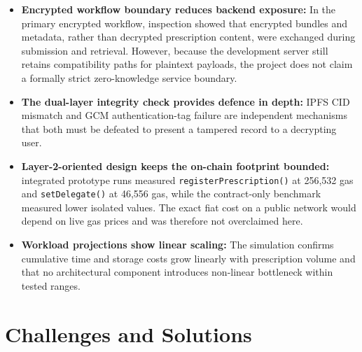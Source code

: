 \documentclass[12pt,a4wide]{report}
\begin{document}
\begin{itemize}
  \item \textbf{Encrypted workflow boundary reduces backend exposure:} In the
    primary encrypted workflow, inspection showed that encrypted bundles and
    metadata, rather than decrypted prescription content, were exchanged during
    submission and retrieval. However, because the development server still retains
    compatibility paths for plaintext payloads, the project does not claim a
    formally strict zero-knowledge service boundary.
  \item \textbf{The dual-layer integrity check provides defence in depth:} IPFS
    CID mismatch and GCM authentication-tag failure are independent mechanisms
    that both must be defeated to present a tampered record to a decrypting user.
  \item \textbf{Layer-2-oriented design keeps the on-chain footprint bounded:}
    integrated prototype runs measured \texttt{registerPrescription()} at
    256{,}532 gas and \texttt{setDelegate()} at 46{,}556 gas, while the contract-only
    benchmark measured lower isolated values. The exact fiat cost on a public
    network would depend on live gas prices and was therefore not overclaimed here.
  \item \textbf{Workload projections show linear scaling:} The simulation confirms cumulative time and storage costs grow linearly with prescription volume and that no architectural component introduces non-linear bottleneck within tested ranges.
\end{itemize}

\section{Challenges and Solutions}
\end{document}
